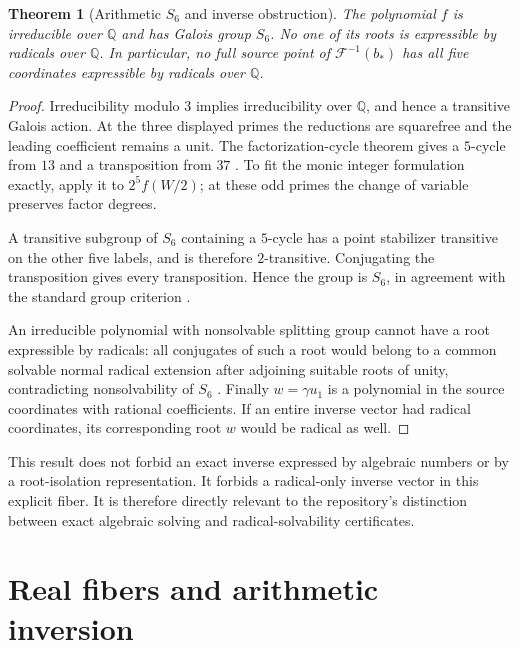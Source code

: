 \documentclass[11pt,a4paper]{article}
\newtheorem{theorem}{Theorem}[section]
\theoremstyle{definition}
\newcommand{\Q}{\mathbb Q}
\newcommand{\F}{\mathcal F}
\begin{document}
\begin{theorem}[Arithmetic $S_6$ and inverse obstruction]
\label{thm:arithmeticS6}
The polynomial $f$ is irreducible over $\Q$ and has Galois group $S_6$.
No one of its roots is expressible by radicals over $\Q$. In particular,
no full source point of $\F^{-1}(b_*)$ has all five coordinates expressible
by radicals over $\Q$.
\end{theorem}
\begin{proof}
Irreducibility modulo $3$ implies irreducibility over $\Q$, and hence a
transitive Galois action. At the three displayed primes the reductions
are squarefree and the leading coefficient remains a unit. The
factorization-cycle theorem gives a $5$-cycle from $13$ and a
transposition from $37$ \cite[Theorem 4.28]{Milne}. To fit the monic
integer formulation exactly, apply it to $2^5f(W/2)$; at these odd
primes the change of variable preserves factor degrees.

A transitive subgroup of $S_6$ containing a $5$-cycle has a point
stabilizer transitive on the other five labels, and is therefore
$2$-transitive. Conjugating the transposition gives every transposition.
Hence the group is $S_6$, in agreement with the standard group criterion
\cite[Lemma 4.31]{Milne}.

An irreducible polynomial with nonsolvable splitting group cannot have
a root expressible by radicals: all conjugates of such a root would
belong to a common solvable normal radical extension after adjoining
suitable roots of unity, contradicting nonsolvability of $S_6$
\cite[\S5, solvability theorem]{Milne}.
Finally $w=\gamma u_1$ is a polynomial in the source coordinates with
rational coefficients. If an entire inverse vector had radical
coordinates, its corresponding root $w$ would be radical as well.
\end{proof}

This result does not forbid an exact inverse expressed by algebraic
numbers or by a root-isolation representation. It forbids a radical-only
inverse vector in this explicit fiber. It is therefore directly relevant
to the repository's distinction between exact algebraic solving and
radical-solvability certificates.

\section{Real fibers and arithmetic inversion}
\label{sec:real}
\end{document}
